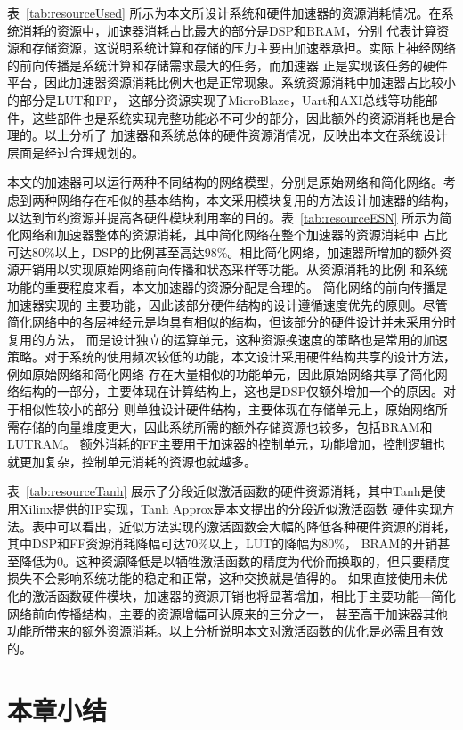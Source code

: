 表~\ref{tab:resourceUsed} 所示为本文所设计系统和硬件加速器的资源消耗情况。在系统消耗的资源中，加速器消耗占比最大的部分是DSP和BRAM，分别
代表计算资源和存储资源，这说明系统计算和存储的压力主要由加速器承担。实际上神经网络的前向传播是系统计算和存储需求最大的任务，而加速器
正是实现该任务的硬件平台，因此加速器资源消耗比例大也是正常现象。系统资源消耗中加速器占比较小的部分是LUT和FF，
这部分资源实现了MicroBlaze，Uart和AXI总线等功能部件，这些部件也是系统实现完整功能必不可少的部分，因此额外的资源消耗也是合理的。以上分析了
加速器和系统总体的硬件资源消情况，反映出本文在系统设计层面是经过合理规划的。

本文的加速器可以运行两种不同结构的网络模型，分别是原始网络和简化网络。考虑到两种网络存在相似的基本结构，本文采用模块复用的方法设计加速器的结构，
以达到节约资源并提高各硬件模块利用率的目的。表~\ref{tab:resourceESN} 所示为简化网络和加速器整体的资源消耗，其中简化网络在整个加速器的资源消耗中
占比可达80\%以上，DSP的比例甚至高达98\%。相比简化网络，加速器所增加的额外资源开销用以实现原始网络前向传播和状态采样等功能。从资源消耗的比例
和系统功能的重要程度来看，本文加速器的资源分配是合理的。
简化网络的前向传播是加速器实现的
主要功能，因此该部分硬件结构的设计遵循速度优先的原则。尽管简化网络中的各层神经元是均具有相似的结构，但该部分的硬件设计并未采用分时复用的方法，
而是设计独立的运算单元，这种资源换速度的策略也是常用的加速策略。对于系统的使用频次较低的功能，本文设计采用硬件结构共享的设计方法，例如原始网络和简化网络
存在大量相似的功能单元，因此原始网络共享了简化网络结构的一部分，主要体现在计算结构上，这也是DSP仅额外增加一个的原因。对于相似性较小的部分
则单独设计硬件结构，主要体现在存储单元上，原始网络所需存储的向量维度更大，因此系统所需的额外存储资源也较多，包括BRAM和LUTRAM。
额外消耗的FF主要用于加速器的控制单元，功能增加，控制逻辑也就更加复杂，控制单元消耗的资源也就越多。


表~\ref{tab:resourceTanh} 展示了分段近似激活函数的硬件资源消耗，其中Tanh是使用Xilinx提供的IP实现，Tanh Approx是本文提出的分段近似激活函数
硬件实现方法。表中可以看出，近似方法实现的激活函数会大幅的降低各种硬件资源的消耗，其中DSP和FF资源消耗降幅可达70\%以上，LUT的降幅为80\%，
BRAM的开销甚至降低为0。这种资源降低是以牺牲激活函数的精度为代价而换取的，但只要精度损失不会影响系统功能的稳定和正常，这种交换就是值得的。
如果直接使用未优化的激活函数硬件模块，加速器的资源开销也将显著增加，相比于主要功能---简化网络前向传播结构，主要的资源增幅可达原来的三分之一，
甚至高于加速器其他功能所带来的额外资源消耗。以上分析说明本文对激活函数的优化是必需且有效的。


\section{本章小结}

